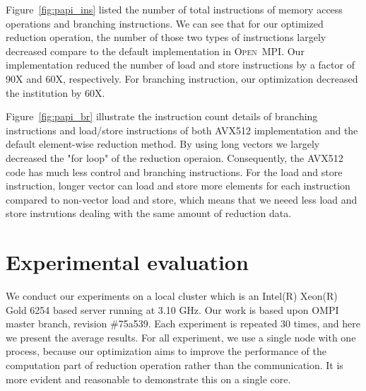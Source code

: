 \documentclass[sigconf]{acmart}
\newcommand{\ompi}[0]{\textsc{Open~MPI}\xspace}
\begin{document}
Figure~\ref{fig:papi_ins} listed the number of total instructions of memory access operations and branching instructions.
We can see that for our optimized reduction operation, the number of those two types of instructions largely decreased compare to the default implementation in \ompi. Our implementation reduced the number of load and store instructions by a factor of
90X and 60X, respectively. For branching instruction, our optimization decreased the institution by 60X.

Figure~\ref{fig:papi_br} illustrate the instruction count details
of branching instructions and load/store instructions of both AVX512 implementation and the default
element-wise reduction method. By using long vectors we largely decreased the "for loop" of the reduction
operaion. Consequently, the AVX512 code has much less control and branching instructions. For the load and store
instruction, longer vector can load and store more elements for each instruction compared to non-vector load and store, which means that we neeed less load and store instrutions dealing with the same amount of reduction data.




\section{Experimental evaluation}\label{sec:experiments}
We conduct our experiments on a local cluster which is an Intel(R) Xeon(R) Gold 6254 based server running at 3.10 GHz. Our work is based upon OMPI master branch, revision \#75a539. Each experiment is repeated 30 times, and here we present the average results. For all experiment, we use a single node with one process, because our optimization aims to improve the performance of the computation part of reduction operation rather than the communication. It is more evident and reasonable to demonstrate this on a single core.
\end{document}
